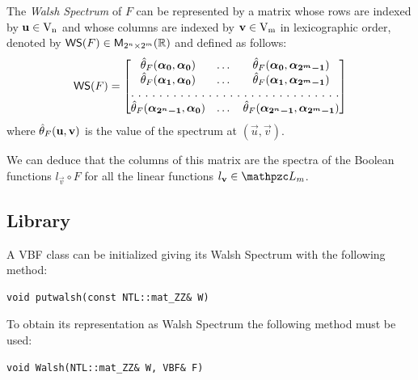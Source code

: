\begin{definition}\label{def:WSVBF}
The \textit{Walsh Spectrum} of $F$ can be represented by a matrix whose rows are indexed by $\vec{u} \in \gf{V_n}$ and whose columns are indexed by $\vec{v} \in \gf{V_m}$ in lexicographic order, denoted by $\matr{WS}(F) \in \matr{M}_{2^n \times 2^m}(\bbbr)$ and defined as follows:
\begin{equation}
\matr{WS}(F) = \begin{bmatrix} \walsh{\theta}_F(\boldsymbol{\alpha_0},\boldsymbol{\alpha_0})&\dots&\walsh{\theta}_F(\boldsymbol{\alpha_0},\boldsymbol{\alpha_{2^m-1}}) \\
\walsh{\theta}_F(\boldsymbol{\alpha_1},\boldsymbol{\alpha_0})&\dots&\walsh{\theta}_F(\boldsymbol{\alpha_1},\boldsymbol{\alpha_{2^m-1}}) \\
\hdotsfor[2]{3}\\
\walsh{\theta}_F(\boldsymbol{\alpha_{2^n-1}},\boldsymbol{\alpha_0})&\dots&\walsh{\theta}_F(\boldsymbol{\alpha_{2^n-1}},\boldsymbol{\alpha_{2^m-1}}) \\
\end{bmatrix} 
\end{equation}
where $\walsh{\theta}_F(\vec{u},\vec{v})$ is the value of the spectrum at $(\vec{u},\vec{v})$.
\end{definition}

We can deduce that the columns of this matrix are the spectra of the Boolean functions $l_{\vec{v}} \circ F$ for all the linear functions $l_{\vec{v}} \in \funct{L}_m$.

\subsection{Library}

A VBF class can be initialized giving its Walsh Spectrum with the following method:

\begin{verbatim}
void putwalsh(const NTL::mat_ZZ& W)
\end{verbatim}

To obtain its representation as Walsh Spectrum the following method must be used:

\begin{verbatim}
void Walsh(NTL::mat_ZZ& W, VBF& F)
\end{verbatim}

